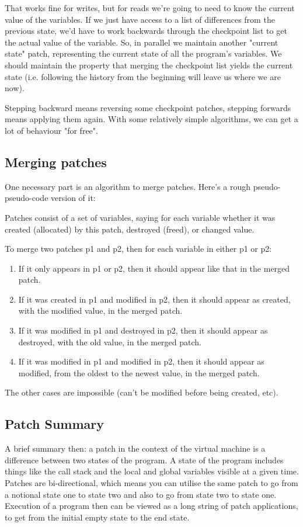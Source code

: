 \documentclass[10pt,a4paper]{report}
\begin{document}
That works fine for writes, but for reads we're going to need to know the current value of the variables. If we just have access to a list of differences from the previous state, we'd have to work backwards through the checkpoint list to get the actual value of the variable. So, in parallel we maintain another "current state" patch, representing the current state of all the program's variables. We should maintain the property that merging the checkpoint list yields the current state (i.e. following the history from the beginning will leave us where we are now).

Stepping backward means reversing some checkpoint patches, stepping forwards means applying them again. With some relatively simple algorithms, we can get a lot of behaviour "for free".

\subsection{Merging patches}
One necessary part is an algorithm to merge patches. Here's a rough pseudo-pseudo-code version of it:

Patches consist of a set of variables, saying for each variable whether it was created (allocated) by this patch, destroyed (freed), or changed value.

To merge two patches p1 and p2, then for each variable in either p1 or p2:

\begin{enumerate}
\item If it only appears in p1 or p2, then it should appear like that in the merged patch.
\item If it was created in p1 and modified in p2, then it should appear as created, with the modified value, in the merged patch.
\item If it was modified in p1 and destroyed in p2, then it should appear as destroyed, with the old value, in the merged patch.
\item If it was modified in p1 and modified in p2, then it should appear as modified, from the oldest to the newest value, in the merged patch. 
\end{enumerate}

The other cases are impossible (can't be modified before being created, etc). 

\subsection{Patch Summary}
A brief summary then: a patch in the context of the virtual machine is a difference between two states of the program. A state of the program includes things like the call stack and the local and global variables visible at a given time. Patches are bi-directional, which means you can utilise the same patch to go from a notional state one to state two and also to go from state two to state one. Execution of a program then can be viewed as a long string of patch applications, to get from the initial empty state to the end state. 
\end{document}
